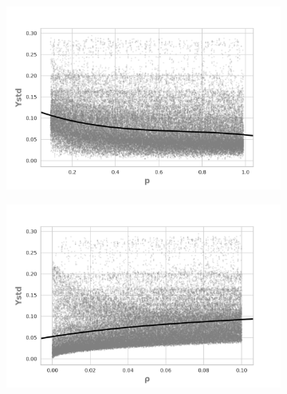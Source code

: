 \begin{figure}[H]
    \begin{subfigure}[b]{0.49\textwidth}
        \includegraphics[width=\textwidth]{ims/nlregressions/nlregressionmutatingop.png}
      \end{subfigure}
          \begin{subfigure}[b]{0.49\textwidth}
            \includegraphics[width=\textwidth]{ims/nlregressions/nlregressionmutatingorho.png}
      \end{subfigure}


\end{figure}
